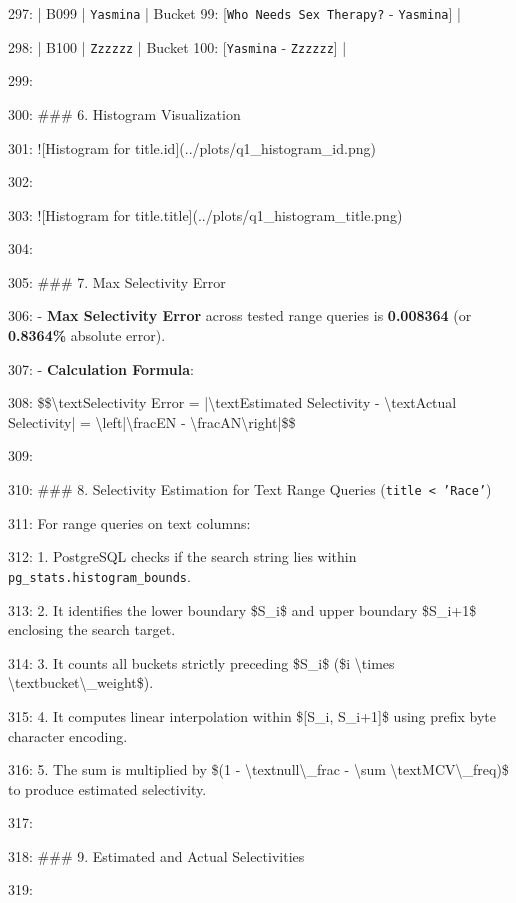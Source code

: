 \documentclass[11pt,a4paper]{article}
\begin{document}
{297: | B099 | \texttt{Yasmina} | Bucket 99: [\texttt{Who Needs Sex Therapy?} - \texttt{Yasmina}] |

298: | B100 | \texttt{Zzzzzz} | Bucket 100: [\texttt{Yasmina} - \texttt{Zzzzzz}] |

299:

300: \#\#\# 6. Histogram Visualization

301: ![Histogram for title.id](../plots/q1\_histogram\_id.png)

302:

303: ![Histogram for title.title](../plots/q1\_histogram\_title.png)

304:

305: \#\#\# 7. Max Selectivity Error

306: - \textbf{Max Selectivity Error} across tested range queries is \textbf{0.008364} (or \textbf{0.8364\%} absolute error).

307: - \textbf{Calculation Formula}:

308:   \$\$\textbackslash{}text{Selectivity Error} = |\textbackslash{}text{Estimated Selectivity} - \textbackslash{}text{Actual Selectivity}| = \textbackslash{}left|\textbackslash{}frac{E}{N} - \textbackslash{}frac{A}{N}\textbackslash{}right|\$\$

309:

310: \#\#\# 8. Selectivity Estimation for Text Range Queries (\texttt{title < 'Race'})

311: For range queries on text columns:

312: 1. PostgreSQL checks if the search string lies within \texttt{pg\_stats.histogram\_bounds}.

313: 2. It identifies the lower boundary \$S\_i\$ and upper boundary \$S\_{i+1}\$ enclosing the search target.

314: 3. It counts all buckets strictly preceding \$S\_i\$ (\$i \textbackslash{}times \textbackslash{}text{bucket\textbackslash{}\_weight}\$).

315: 4. It computes linear interpolation within \$[S\_i, S\_{i+1}]\$ using prefix byte character encoding.

316: 5. The sum is multiplied by \$(1 - \textbackslash{}text{null\textbackslash{}\_frac} - \textbackslash{}sum \textbackslash{}text{MCV\textbackslash{}\_freq})\$ to produce estimated selectivity.

317:

318: \#\#\# 9. Estimated and Actual Selectivities

319:

}
\end{document}
